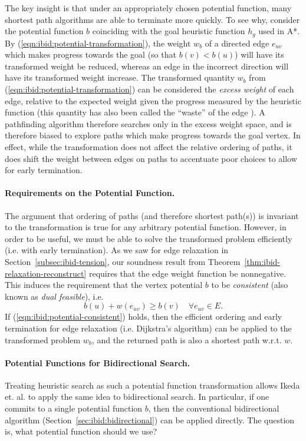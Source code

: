 The key insight is that under an appropriately chosen potential function,
many shortest path algorithms are able to terminate more quickly.
To see why,
consider the potential function $b$ coinciding with the goal heuristic
function $h_g$ used in A*.
By (\ref{eqn:ibid:potential-transformation}),
the weight $w_b$ of a directed edge $e_{uv}$ which makes
progress towards the goal (so that $b(v) < b(u)$)
will have its transformed weight be reduced,
whereas an edge in the incorrect direction will have its transformed
weight increase.
The transformed quantity $w_b$
from (\ref{eqn:ibid:potential-transformation})
can be considered the \emph{excess weight} of each edge,
relative to the expected weight given the progress measured by the
heuristic function
(this quantity has also been called the ``waste'' of the edge
\citep{pohl1969bidirectional}).
A pathfinding algorithm therefore searches only in the excess weight
space,
and is therefore biased to explore paths which make progress towards
the goal vertex.
In effect,
while the transformation does not affect the relative ordering of
paths,
it does shift the weight between edges on paths to accentuate poor
choices to allow for early termination.

\paragraph{Requirements on the Potential Function.}
The argument that ordering of paths (and therefore shortest path(s))
is invariant to the transformation is true for any arbitrary
potential function.
However,
in order to be useful,
we must be able to solve the transformed problem efficiently
(i.e. with early termination).
As we saw for edge relaxation in Section~\ref{subsec:ibid-tension},
our soundness result from Theorem~\ref{thm:ibid-relaxation-reconstruct}
requires that the edge weight function be nonnegative.
This induces the requirement that
the vertex potential $b$ to be \emph{consistent}
(also known as \emph{dual feasible}), i.e.
\begin{equation}
   b(u) + w(e_{uv}) \geq b(v) \quad\forall e_{uv} \in E.
   \label{eqn:ibid:potential-consistent}
\end{equation}
If (\ref{eqn:ibid:potential-consistent}) holds,
then the efficient ordering and early termination
for edge relaxation (i.e. Dijkstra's algorithm)
can be applied to the transformed problem $w_b$,
and the returned path is also a shortest path w.r.t. $w$. 

\paragraph{Potential Functions for Bidirectional Search.}
Treating heuristic search as such a potential function transformation
allows Ikeda et. al. \citep{ikeda1994betterroutes} to apply
the same idea to bidirectional search.
In particular,
if one commits to a single potential function $b$,
then the conventional bidirectional algorithm
(Section~\ref{sec:ibid:bidirectional})
can be applied directly.
The question is,
what potential function should we use?

